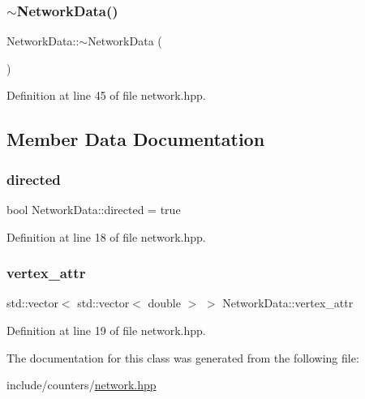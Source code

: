 \subsubsection{\texorpdfstring{$\sim$\+Network\+Data()}{~NetworkData()}}
{\footnotesize\ttfamily Network\+Data\+::$\sim$\+Network\+Data (\begin{DoxyParamCaption}{ }\end{DoxyParamCaption})\hspace{0.3cm}{\ttfamily [inline]}}



Definition at line 45 of file network.\+hpp.



\subsection{Member Data Documentation}
\mbox{\label{class_network_data_a5e67b89f22ad1151680a5f4428c6c780}} 
\subsubsection{\texorpdfstring{directed}{directed}}
{\footnotesize\ttfamily bool Network\+Data\+::directed = true}



Definition at line 18 of file network.\+hpp.

\mbox{\label{class_network_data_a3dc3e5549abc6daa85f30dbdc504ecac}} 
\subsubsection{\texorpdfstring{vertex\+\_\+attr}{vertex\_attr}}
{\footnotesize\ttfamily std\+::vector$<$ std\+::vector$<$ double $>$ $>$ Network\+Data\+::vertex\+\_\+attr}



Definition at line 19 of file network.\+hpp.



The documentation for this class was generated from the following file\+:\begin{DoxyCompactItemize}
\item 
include/counters/\hyperlink{network_8hpp}{network.\+hpp}\end{DoxyCompactItemize}
